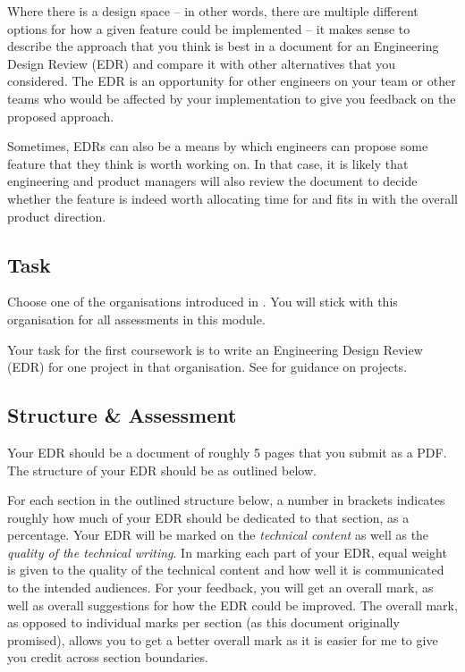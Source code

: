 Where there is a design space -- in other words, there are multiple different options for how a given feature could be implemented -- it makes sense to describe the approach that you think is best in a document for an Engineering Design Review (EDR) and compare it with other alternatives that you considered. The EDR is an opportunity for other engineers on your team or other teams who would be affected by your implementation to give you feedback on the proposed approach.

Sometimes, EDRs can also be a means by which engineers can propose some feature that they think is worth working on. In that case, it is likely that engineering and product managers will also review the document to decide whether the feature is indeed worth allocating time for and fits in with the overall product direction.

\subsection{Task}

Choose one of the organisations introduced in . You will stick with this organisation for all assessments in this module.

Your task for the first coursework is to write an Engineering Design Review (EDR) for one project in that organisation. See  for guidance on projects.

\subsection{Structure \& Assessment}

Your EDR should be a document of roughly 5 pages that you submit as a PDF. The structure of your EDR should be as outlined below.

For each section in the outlined structure below, a number in brackets indicates roughly how much of your EDR should be dedicated to that section, as a percentage. Your EDR will be marked on the \emph{technical content} as well as the \emph{quality of the technical writing}. In marking each part of your EDR, equal weight is given to the quality of the technical content and how well it is communicated to the intended audiences. For your feedback, you will get an overall mark, as well as overall suggestions for how the EDR could be improved. The overall mark, as opposed to individual marks per section (as this document originally promised), allows you to get a better overall mark as it is easier for me to give you credit across section boundaries.

